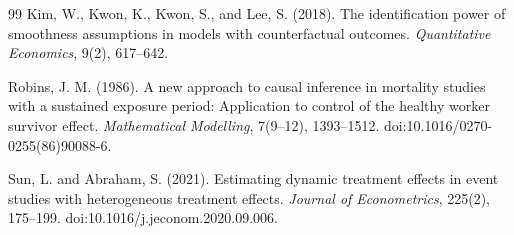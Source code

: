 \documentclass[11pt]{article}
\theoremstyle{definition}
\theoremstyle{plain}
\theoremstyle{remark}
\begin{document}
\begin{thebibliography}{99}
Kim, W., Kwon, K., Kwon, S., and Lee, S. (2018).
The identification power of smoothness assumptions in models with
counterfactual outcomes.
\emph{Quantitative Economics}, 9(2), 617--642.

Robins, J. M. (1986).
A new approach to causal inference in mortality studies with a sustained
exposure period: Application to control of the healthy worker survivor effect.
\emph{Mathematical Modelling}, 7(9--12), 1393--1512.
doi:10.1016/0270-0255(86)90088-6.

Sun, L. and Abraham, S. (2021).
Estimating dynamic treatment effects in event studies with heterogeneous
treatment effects.
\emph{Journal of Econometrics}, 225(2), 175--199.
doi:10.1016/j.jeconom.2020.09.006.
\end{thebibliography}
\end{document}

